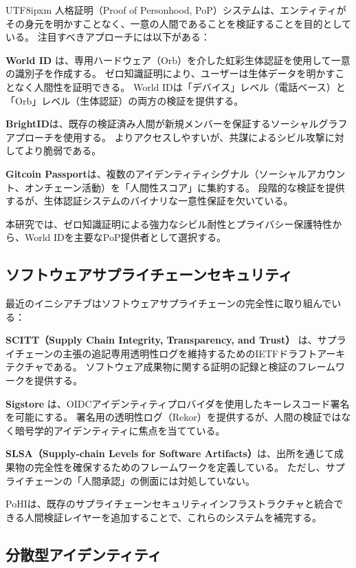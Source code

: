 \documentclass[a4paper,10pt]{article}
\begin{document}
\begin{CJK}{UTF8}{ipxm}
人格証明（Proof of Personhood, PoP）システムは、エンティティがその身元を明かすことなく、一意の人間であることを検証することを目的としている。
注目すべきアプローチには以下がある：

\textbf{World ID} \cite{worldid}は、専用ハードウェア（Orb）を介した虹彩生体認証を使用して一意の識別子を作成する。
ゼロ知識証明により、ユーザーは生体データを明かすことなく人間性を証明できる。
World IDは「デバイス」レベル（電話ベース）と「Orb」レベル（生体認証）の両方の検証を提供する。

\textbf{BrightID}は、既存の検証済み人間が新規メンバーを保証するソーシャルグラフアプローチを使用する。
よりアクセスしやすいが、共謀によるシビル攻撃に対してより脆弱である。

\textbf{Gitcoin Passport}は、複数のアイデンティティシグナル（ソーシャルアカウント、オンチェーン活動）を「人間性スコア」に集約する。
段階的な検証を提供するが、生体認証システムのバイナリな一意性保証を欠いている。

本研究では、ゼロ知識証明による強力なシビル耐性とプライバシー保護特性から、World IDを主要なPoP提供者として選択する。

\subsection{ソフトウェアサプライチェーンセキュリティ}

最近のイニシアチブはソフトウェアサプライチェーンの完全性に取り組んでいる：

\textbf{SCITT（Supply Chain Integrity, Transparency, and Trust）} \cite{scitt}は、サプライチェーンの主張の追記専用透明性ログを維持するためのIETFドラフトアーキテクチャである。
ソフトウェア成果物に関する証明の記録と検証のフレームワークを提供する。

\textbf{Sigstore} \cite{sigstore}は、OIDCアイデンティティプロバイダを使用したキーレスコード署名を可能にする。
署名用の透明性ログ（Rekor）を提供するが、人間の検証ではなく暗号学的アイデンティティに焦点を当てている。

\textbf{SLSA（Supply-chain Levels for Software Artifacts）}は、出所を通じて成果物の完全性を確保するためのフレームワークを定義している。
ただし、サプライチェーンの「人間承認」の側面には対処していない。

PoHIは、既存のサプライチェーンセキュリティインフラストラクチャと統合できる人間検証レイヤーを追加することで、これらのシステムを補完する。

\subsection{分散型アイデンティティ}


\end{CJK}
\end{document}
